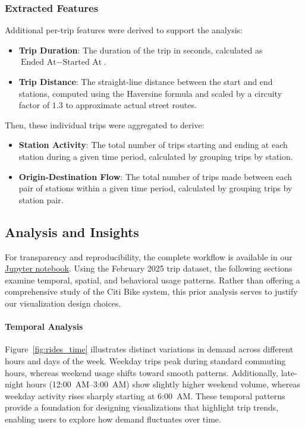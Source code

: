 \subsubsection{Extracted Features}
Additional per-trip features were derived to support the analysis:
\begin{itemize}
    \item \textbf{Trip Duration}: The duration of the trip in seconds, calculated as $\text{Ended At} - \text{Started At}$.
    \item \textbf{Trip Distance}: The straight-line distance between the start and end stations, computed using the Haversine formula and scaled by a circuity factor of $1.3$ to approximate actual street routes.
\end{itemize}

Then, these individual trips were aggregated to derive:
\begin{itemize} 
    \item \textbf{Station Activity}: The total number of trips starting and ending at each station during a given time period, calculated by grouping trips by station.
    \item \textbf{Origin-Destination Flow}: The total number of trips made between each pair of stations within a given time period, calculated by grouping trips by station pair.
\end{itemize}

\subsection{Analysis and Insights}
For transparency and reproducibility, the complete workflow is available in our \href{https://github.com/davide-dona/nyc-bike-data-visualization/blob/main/src/notebooks/analysis.ipynb}{\underline{Jupyter notebook}}.
Using the February 2025 trip dataset, the following sections examine temporal, spatial, and behavioral usage patterns.
Rather than offering a comprehensive study of the Citi Bike system, this prior analysis serves to justify our visualization design choices.

\paragraph{Temporal Analysis}
Figure~\ref{fig:rides_time} illustrates distinct variations in demand across different hours and days of the week.
Weekday trips peak during standard commuting hours, whereas weekend usage shifts toward smooth patterns.
Additionally, late-night hours (12:00~AM--3:00~AM) show slightly higher weekend volume, whereas weekday activity rises sharply starting at 6:00~AM.
These temporal patterns provide a foundation for designing visualizations that highlight trip trends, enabling users to explore how demand fluctuates over time.

